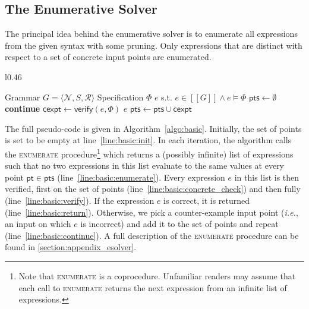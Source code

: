 \documentclass{llncs}
\newcommand{\ie}{\emph{i.e.}}
\newcommand\tuple[1]{\langle #1 \rangle}
\newcommand\Points{\mathsf{pts}}
\newcommand\Point{\mathsf{pt}}
\newcommand\Verify{\mathsf{verify}}
\newcommand\CexInput{\mathsf{cexpt}}
\newcommand\Expr{e}
\newcommand\Spec{\Phi}
\newcommand\Grammar{G}
\newcommand\sem[1]{[\![ #1 ]\!]}
\newcommand\NonTerminals{\mathcal{N}}
\newcommand\StartSymbol{S}
\newcommand\Rules{\mathcal{R}}
\begin{document}
\subsection{The Enumerative Solver}
\label{sec:enumeration}

The principal idea behind the enumerative solver is to enumerate all
expressions from the given syntax with some pruning.
Only expressions that are distinct with respect to a set of concrete
input points are enumerated.

\begin{wrapfigure}{l}{0.46\textwidth}
  \begin{minipage}{0.46\textwidth}
    \begin{algorithm}[H]
      \begin{algorithmic}[1]
        \fontsize{8}{10}\selectfont
        \Require Grammar $\Grammar = \tuple { \NonTerminals, \StartSymbol, \Rules }$
        \Require Specification $\Spec$
        \Ensure $\Expr$ s.t.  $\Expr \in \sem{\Grammar} \wedge \Expr \models \Spec$
        \State $\Points \gets \emptyset$ \label{line:basic:init}
        \For {$\Expr \in \Call{enumerate}{\Grammar,\Points}$ }\label{line:basic:enumerate}
        \If { $\Expr \not\models \Spec \downharpoonleft  \Points$ } \textbf{continue} \EndIf\label{line:basic:concrete_check}
        \State $\CexInput \gets \Verify(\Expr, \Spec)$ \label{line:basic:verify}
        \If { $\CexInput = \bot$ } \Return $\Expr$ \EndIf \label{line:basic:return}
        \State $\Points \gets \Points \cup \CexInput$ \label{line:basic:continue}
        \EndFor
        \EndWhile
      \end{algorithmic}
      \caption{Enumerative Solver}
      \label{algo:basic}
    \end{algorithm}
  \end{minipage}
\end{wrapfigure}
\noindent
The full pseudo-code is given in Algorithm~\ref{algo:basic}.
Initially, the set of points is set to be empty at
line~\ref{line:basic:init}.  In each iteration, the algorithm calls
the \textsc{enumerate} procedure\footnote{Note that \textsc{enumerate} is
a coprocedure.  Unfamiliar readers may assume that each call to \textsc{enumerate}
returns the next expression from an infinite list of
expressions.} which returns a (possibly infinite) list of expressions
such that no two expressions in this list evaluate to the same values
at every point $\Point \in \Points$ (line~\ref{line:basic:enumerate}).
Every expression $\Expr$ in this list is then verified, first on the
set of points (line~\ref{line:basic:concrete_check}) and then fully
(line~\ref{line:basic:verify}).  If the expression $\Expr$ is correct,
it is returned (line~\ref{line:basic:return}).  Otherwise, we pick a
counter-example input point (\ie, an input on which $\Expr$ is
incorrect) and add it to the set of points and repeat
(line~\ref{line:basic:continue}). A full description of the
\textsc{enumerate} procedure can be found in
\ref{section:appendix_esolver}.
\end{document}
